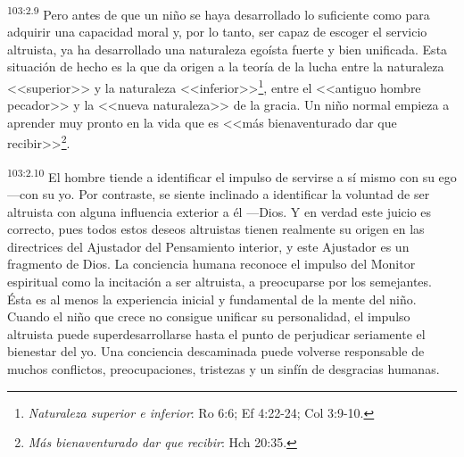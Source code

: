 \documentclass[twoside, 11pt]{book}
\begin{document}
\par
\textsuperscript{103:2.9} Pero antes de que un niño se haya desarrollado lo suficiente como para adquirir una capacidad moral y, por lo tanto, ser capaz de escoger el servicio altruista, ya ha desarrollado una naturaleza egoísta fuerte y bien unificada. Esta situación de hecho es la que da origen a la teoría de la lucha entre la naturaleza <<superior>> y la naturaleza <<inferior>>\footnote{\textit{Naturaleza superior e inferior}: Ro 6:6; Ef 4:22-24; Col 3:9-10.}, entre el <<antiguo hombre pecador>> y la <<nueva naturaleza>> de la gracia. Un niño normal empieza a aprender muy pronto en la vida que es <<más bienaventurado dar que recibir>>\footnote{\textit{Más bienaventurado dar que recibir}: Hch 20:35.}.

\par
\textsuperscript{103:2.10} El hombre tiende a identificar el impulso de servirse a sí mismo con su ego ---con su yo. Por contraste, se siente inclinado a identificar la voluntad de ser altruista con alguna influencia exterior a él ---Dios. Y en verdad este juicio es correcto, pues todos estos deseos altruistas tienen realmente su origen en las directrices del Ajustador del Pensamiento interior, y este Ajustador es un fragmento de Dios. La conciencia humana reconoce el impulso del Monitor espiritual como la incitación a ser altruista, a preocuparse por los semejantes. Ésta es al menos la experiencia inicial y fundamental de la mente del niño. Cuando el niño que crece no consigue unificar su personalidad, el impulso altruista puede superdesarrollarse hasta el punto de perjudicar seriamente el bienestar del yo. Una conciencia descaminada puede volverse responsable de muchos conflictos, preocupaciones, tristezas y un sinfín de desgracias humanas.
\end{document}
